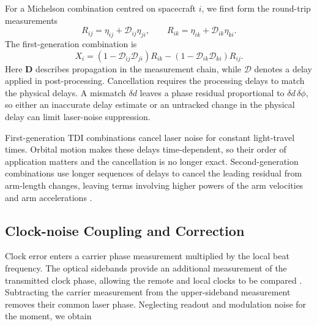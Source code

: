 For a Michelson combination centred on spacecraft $i$, we first form the round-trip measurements
\begin{equation*}
    R_{ij}=\eta_{ij}+\mathcal D_{ij}\eta_{ji},\qquad
    R_{ik}=\eta_{ik}+\mathcal D_{ik}\eta_{ki}.
\end{equation*}
The first-generation combination is
\begin{equation}\label{eq:michelson_tdi}
    X_i=(1-\mathcal D_{ij}\mathcal D_{ji})R_{ik}
       -(1-\mathcal D_{ik}\mathcal D_{ki})R_{ij}.
\end{equation}
Here $\mathbf D$ describes propagation in the measurement chain, while $\mathcal D$ denotes a delay applied in post-processing. Cancellation requires the processing delays to match the physical delays. A mismatch $\delta d$ leaves a phase residual proportional to $\delta d\,\delta\dot\phi$, so either an inaccurate delay estimate or an untracked change in the physical delay can limit laser-noise suppression.

First-generation \ac{TDI} combinations cancel laser noise for constant light-travel times. Orbital motion makes these delays time-dependent, so their order of application matters and the cancellation is no longer exact. Second-generation combinations use longer sequences of delays to cancel the leading residual from arm-length changes, leaving terms involving higher powers of the arm velocities and arm accelerations \cite{tinto2018time}.




\subsection{Clock-noise Coupling and Correction}
\label{clock noise}
Clock error enters a carrier phase measurement multiplied by the local beat frequency. The optical sidebands provide an additional measurement of the transmitted clock phase, allowing the remote and local clocks to be compared \cite{hartwig_clock-jitter_2021}. Subtracting the carrier measurement from the upper-sideband measurement removes their common laser phase. Neglecting readout and modulation noise for the moment, we obtain

